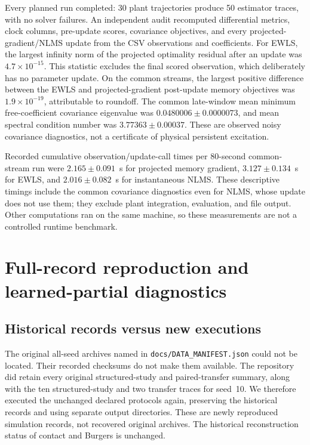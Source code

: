 \documentclass[journal]{IEEEtran}
\begin{document}
Every planned run completed: 30 plant trajectories produce 50 estimator
traces, with no solver failures. An independent audit recomputed differential
metrics, clock columns, pre-update scores, covariance objectives, and every
projected-gradient/NLMS update from the CSV observations and coefficients.
For EWLS, the largest infinity norm of the projected optimality residual
after an update was $4.7\times10^{-15}$. This statistic excludes the final
scored observation, which deliberately has no parameter update. On the
common streams, the largest positive difference between the EWLS and
projected-gradient post-update memory objectives was
$1.9\times10^{-19}$, attributable to roundoff. The common late-window mean
minimum free-coefficient covariance eigenvalue was
$0.0480006\pm0.0000073$, and mean spectral condition number was
$3.77363\pm0.00037$. These are observed noisy covariance diagnostics, not a
certificate of physical persistent excitation.

Recorded cumulative observation/update-call times per 80-second common-stream
run were $2.165\pm0.091$~s for projected memory gradient,
$3.127\pm0.134$~s for EWLS, and $2.016\pm0.082$~s for instantaneous NLMS.
These descriptive timings include the common covariance diagnostics even
for NLMS, whose update does not use them; they exclude plant integration,
evaluation, and file output. Other computations ran on the same machine,
so these measurements are not a controlled runtime benchmark.
%
\section{Full-record reproduction and learned-partial diagnostics}
\label{sec:reproduction_audit}

\subsection{Historical records versus new executions}
The original all-seed archives named in \texttt{docs/DATA\_MANIFEST.json}
could not be located. Their recorded checksums do not make them available.
The repository did retain every original structured-study and paired-transfer
summary, along with the ten structured-study and two transfer traces for seed~10.
We therefore executed the unchanged declared protocols again, preserving
the historical records and using separate output directories. These are
newly reproduced simulation records, not recovered original archives.
The historical reconstruction status of contact and Burgers is unchanged.
\end{document}
